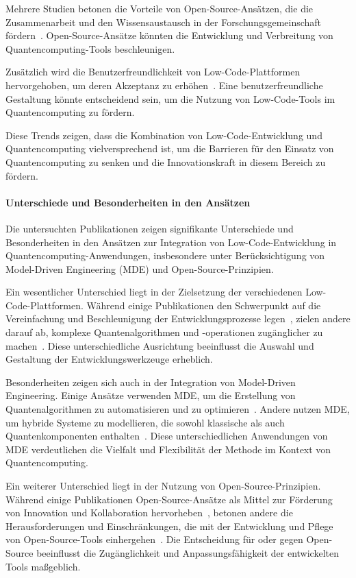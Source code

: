 Mehrere Studien betonen die Vorteile von Open-Source-Ansätzen, die die Zusammenarbeit und den Wissensaustausch 
in der Forschungsgemeinschaft fördern~\cite{Amato_2023, Gemeinhardt_2023}. Open-Source-Ansätze könnten die 
Entwicklung und Verbreitung von Quantencomputing-Tools beschleunigen.

Zusätzlich wird die Benutzerfreundlichkeit von Low-Code-Plattformen hervorgehoben, um deren Akzeptanz zu erhöhen~\cite{Pinho_2022, Prinz_2021}. 
Eine benutzerfreundliche Gestaltung könnte entscheidend sein, um die Nutzung von Low-Code-Tools im Quantencomputing zu fördern.

Diese Trends zeigen, dass die Kombination von Low-Code-Entwicklung und Quantencomputing vielversprechend ist, um die 
Barrieren für den Einsatz von Quantencomputing zu senken und die Innovationskraft in diesem Bereich zu fördern.

\paragraph{Unterschiede und Besonderheiten in den Ansätzen}

Die untersuchten Publikationen zeigen signifikante Unterschiede und Besonderheiten in den Ansätzen 
zur Integration von Low-Code-Entwicklung in Quantencomputing-Anwendungen, insbesondere unter Berücksichtigung 
von Model-Driven Engineering (MDE) und Open-Source-Prinzipien.

Ein wesentlicher Unterschied liegt in der Zielsetzung der verschiedenen Low-Code-Plattformen. 
Während einige Publikationen den Schwerpunkt auf die Vereinfachung und Beschleunigung der 
Entwicklungsprozesse legen~\cite{Sahay_2020, Khorram_2020}, zielen andere darauf ab, komplexe 
Quantenalgorithmen und -operationen zugänglicher zu machen~\cite{Gemeinhardt_2021, Gemeinhardt_2023}. 
Diese unterschiedliche Ausrichtung beeinflusst die Auswahl und Gestaltung der Entwicklungswerkzeuge erheblich.

Besonderheiten zeigen sich auch in der Integration von Model-Driven Engineering. Einige Ansätze 
verwenden MDE, um die Erstellung von Quantenalgorithmen zu automatisieren und zu optimieren~\cite{Moin_2021, Perez-Castillo_2022}. 
Andere nutzen MDE, um hybride Systeme zu modellieren, die sowohl klassische als auch Quantenkomponenten 
enthalten~\cite{Weder_2020, Polat_2024}. Diese unterschiedlichen Anwendungen von MDE verdeutlichen die Vielfalt 
und Flexibilität der Methode im Kontext von Quantencomputing.

Ein weiterer Unterschied liegt in der Nutzung von Open-Source-Prinzipien. Während einige Publikationen Open-Source-Ansätze 
als Mittel zur Förderung von Innovation und Kollaboration hervorheben~\cite{Amato_2023, Ahmad_2023}, betonen andere die 
Herausforderungen und Einschränkungen, die mit der Entwicklung und Pflege von Open-Source-Tools einhergehen~\cite{Sanchez_2021}. 
Die Entscheidung für oder gegen Open-Source beeinflusst die Zugänglichkeit und Anpassungsfähigkeit der entwickelten Tools maßgeblich.

